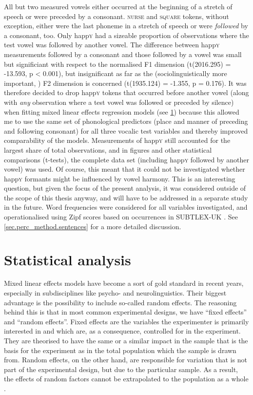 All but two measured vowels either occurred at the beginning of a stretch of speech or were preceded by a consonant.
\textsc{nurse} and \textsc{square} tokens, without exception, either were the last phoneme in a stretch of speech or were \emph{followed} by a consonant, too.
Only happ\textsc{y} had a sizeable proportion of observations where the test vowel was followed by another vowel.
The difference between happ\textsc{y} measurements followed by a consonant and those followed by a vowel was small but significiant with respect to the normalised F1 dimension (t(2016.295) = -13.593, p < 0.001), but insignificant as far as the (sociolinguistically more important, \citealt[cf.][502]{labov2006a}) F2 dimension is concerned (t(1935.124) = -1.355, p = 0.176).
It was therefore decided to drop happ\textsc{y} tokens that occurred before another vowel (along with \emph{any} observation where a test vowel was followed or preceded by silence) when fitting mixed linear effects regression models (see \ref{sec.prod_method.stats}) because this allowed me to use the same set of phonological predictors (place and manner of preceding and following consonant) for all three vocalic test variables and thereby improved comparability of the models.
Measurements of happ\textsc{y} still accounted for the largest share of total observations, and in figures and other statistical comparisons (t-tests), the complete data set (including happ\textsc{y} followed by another vowel) was used.
Of course, this meant that it could not be investigated whether happ\textsc{y} formants might be influenced by vowel harmony.
This is an interesting question, but given the focus of the present analysis, it was considered outside of the scope of this thesis anyway, and will have to be addressed in a separate study in the future.
Word frequencies were considered for all variables investigated, and operationalised using Zipf scores based on occurrences in SUBTLEX-UK \parencite{heuvenetal2014}.
See \ref{sec.perc_method.sentences} for a more detailed discussion.

	\section{Statistical analysis}
	\label{sec.prod_method.stats}

Mixed linear effects models have become a sort of gold standard in recent years, especially in subdisciplines like psycho- and neurolinguistics.
Their biggest advantage is the possibility to include so-called random effects.
The reasoning behind this is that in most common experimental designs, we have ``fixed effects'' and ``random effects''.
Fixed effects are the variables the experimenter is primarily interested in and which are, as a consequence, controlled for in the experiment.
They are theorised to have the same or a similar impact in the sample that is the basis for the experiment as in the total population which the sample is drawn from.
Random effects, on the other hand, are responsible for variation that is not part of the experimental design, but due to the particular sample.
As a result, the effects of random factors cannot be extrapolated to the population as a whole \parencite[cf.][]{barretal2013}.

